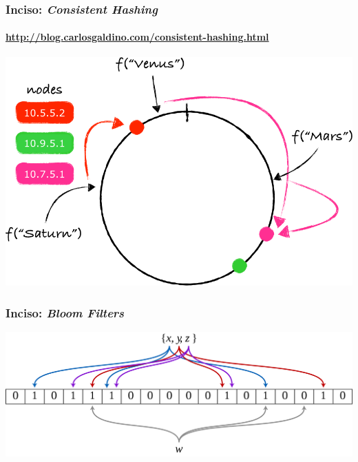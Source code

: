 \documentclass[14pt]{beamer}
\begin{document}
\begin{frame}
  \frametitle{Inciso: {\em Consistent Hashing}}
\framesubtitle{\url{http://blog.carlosgaldino.com/consistent-hashing.html}}
  \includegraphics[width=\textwidth]{img/consistent-hashing}
\end{frame}

\begin{frame}
  \frametitle{Inciso: {\em Bloom Filters}}
\includegraphics[width=\textwidth]{img/bloom_filter}
\end{frame}

\end{document}

